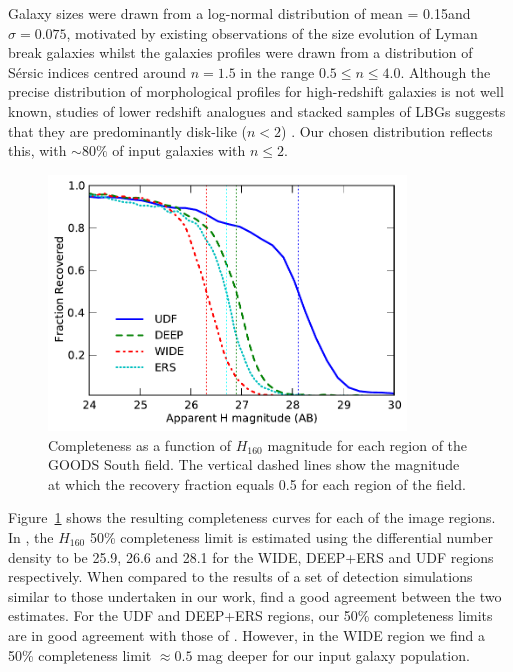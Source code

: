 Galaxy sizes were drawn from a log-normal distribution of mean = 0.15\arcsec and $\sigma = 0.075$, motivated by existing observations of the size evolution of Lyman break galaxies \citep{2004ApJ...600L.107F,2010ApJ...709L..21O,2011A&A...532A..33G,Huang:2013kb} whilst the galaxies profiles were drawn from a distribution of S\'{e}rsic indices centred around $n=1.5$ in the range $0.5 \le n \le 4.0$. Although the precise distribution of morphological profiles for high-redshift galaxies is not well known, studies of lower redshift analogues and stacked samples of LBGs suggests that they are predominantly disk-like ($n < 2$) \citep{Ravindranath:2006ie,Hathi:2007fh}. Our chosen distribution reflects this, with $\sim 80\%$ of input galaxies with $n \leq 2$.

\begin{figure}
\centering
\includegraphics[width=95mm]{plots/fig3.pdf}

\caption[Short caption]{Completeness as a function of $H_{160}$ magnitude for each region of the GOODS South field. The vertical dashed lines show the magnitude at which the recovery fraction equals 0.5 for each region of the field.}
\label{fig:completeness}
\end{figure}

Figure~\ref{fig:completeness} shows the resulting completeness curves for each of the image regions. In \citet{Guo:2013ig}, the $H_{160}$ 50\% completeness limit is estimated using the differential number density to be 25.9, 26.6 and 28.1 for the WIDE, DEEP+ERS and UDF regions respectively. When compared to the results of a set of detection simulations similar to those undertaken in our work, \citet{Guo:2013ig} find a good agreement between the two estimates. For the UDF and DEEP+ERS regions, our 50\% completeness limits are in good agreement with those of \citet{Guo:2013ig}. However, in the WIDE region we find a 50\% completeness limit $\approx 0.5$ mag deeper for our input galaxy population.

